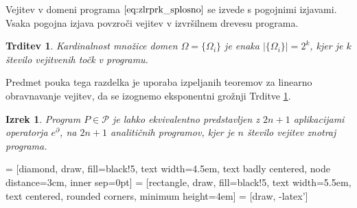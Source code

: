 \documentclass[a4paper, 12pt]{book}
\newcommand{\dP}{\mathcal{P}}
\newcommand{\D}{\partial}
\newtheorem{izrek}{Izrek}[chapter]
\newtheorem{trditev}{Trditev}[izrek]
\begin{document}
\noindent Vejitev v domeni programa $\eqref{eq:zlrprk_splosno}$ se izvede s pogojnimi izjavami. Vsaka pogojna izjava povzroči vejitev v izvršilnem drevesu programa.

\begin{trditev}\label{izr:st.zlepkov}
Kardinalnost množice domen $\Omega=\{\Omega_i\}$ je enaka $\lvert\{\Omega_i
\}\rvert=2^k$, kjer je $k$ število vejitvenih točk v programu.
\end{trditev}

Predmet pouka tega razdelka je uporaba izpeljanih teoremov za linearno obravnavanje vejitev, da se izognemo eksponentni grožnji Trditve \ref{izr:st.zlepkov}.

\begin{izrek}\label{izr:2n+1}
Program $P\in\dP$ je lahko ekvivalentno predstavljen z $2n+1$
aplikacijami operatorja $e^\D$, na $2n+1$ analitičnih programov, kjer je
$n$ število vejitev znotraj programa.
\end{izrek}
 = [diamond, draw, fill=black!5, 
    text width=4.5em, text badly centered, node distance=3cm, inner sep=0pt]
 = [rectangle, draw, fill=black!5, 
    text width=5.5em, text centered, rounded corners, minimum height=4em]
 = [draw, -latex']
\end{document}
